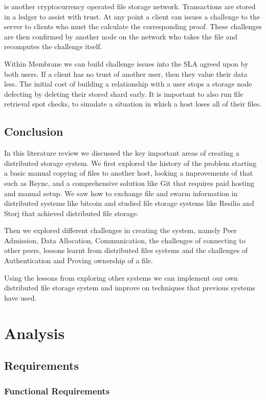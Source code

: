 \documentclass[a4paper, 11pt, twocolumn, twoside]{report}
\begin{document}
\cite{filecoin2014filecoin} is another cryptocurrency operated file storage network. Transactions are stored in a ledger to assist with trust. At any point a client can issues a challenge to the server to clients who must the calculate the corresponding proof. These challenges are then confirmed by another node on the network who takes the file and recomputes the challenge itself.

Within Membrane we can build challenge issues into the SLA agreed upon by both users. If a client has no trust of another user, then they value their data less. The initial cost of building a relationship with a user stops a storage node defecting by deleting their stored shard early. It is important to also run file retrieval spot checks, to simulate a situation in which a host loses all of their files.

\section{Conclusion}
In this literature review we discussed the key important areas of creating a distributed storage system. We first explored the history of the problem starting a basic manual copying of files to another host, looking a improvements of that such as Rsync, and a comprehensive solution like Git that requires paid hosting and manual setup. We saw how to exchange file and swarm information in distributed systems like bitcoin and studied file storage systems like Resilio and Storj that achieved distributed file storage.

Then we explored different challenges in creating the system, namely Peer Admission, Data Allocation, Communication, the challenges of connecting to other peers, lessons learnt from distributed files systems and the challenges of Authentication and Proving ownership of a file.

Using the lessons from exploring other systems we can implement our own distributed file storage system and improve on techniques that previous systems have used.

\chapter{Analysis}

\section{Requirements}

\subsection{Functional Requirements}
\end{document}
